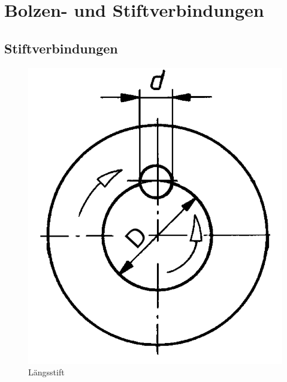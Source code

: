 \section{Bolzen- und Stiftverbindungen}
\subsection{Stiftverbindungen}
\begin{figure}[H]
	\centering
	\begin{minipage}[b]{0.22\linewidth}
		\includegraphics[width=\linewidth]{bolzen-und-stiftverbindungen/laengststift}
		\caption*{Längsstift}
	\end{minipage}
	\begin{minipage}[b]{0.22\linewidth}

\end{minipage}
\end{figure}
